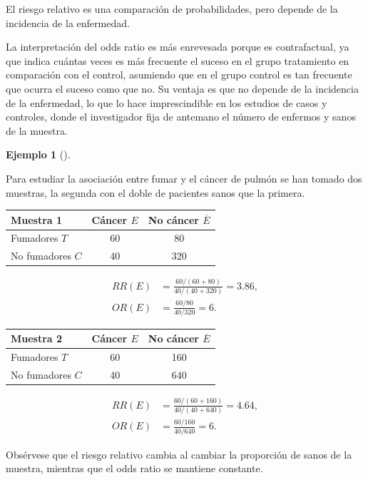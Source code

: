 \documentclass[
  spanish,
  a4paper,
]{scrreport}
\newcounter{none} %
\theoremstyle{definition}
\theoremstyle{definition}
\newtheorem{example}{Ejemplo}[chapter]
\theoremstyle{remark}
\begin{document}
El riesgo relativo es una comparación de probabilidades, pero depende de
la incidencia de la enfermedad.

La interpretación del odds ratio es más enrevesada porque es
contrafactual, ya que indica cuántas veces es más frecuente el suceso en
el grupo tratamiento en comparación con el control, asumiendo que en el
grupo control es tan frecuente que ocurra el suceso como que no. Su
ventaja es que no depende de la incidencia de la enfermedad, lo que lo
hace imprescindible en los estudios de casos y controles, donde el
investigador fija de antemano el número de enfermos y sanos de la
muestra.

\begin{example}[]\protect\hypertarget{exm-riesgo-relativo-odds-ratio}{}\label{exm-riesgo-relativo-odds-ratio}

Para estudiar la asociación entre fumar y el cáncer de pulmón se han
tomado dos muestras, la segunda con el doble de pacientes sanos que la
primera.

{\def\LTcaptype{none} %
\begin{longtable}[]{@{}lcc@{}}
\toprule\noalign{}
\textbf{Muestra 1} & Cáncer \(E\) & No cáncer \(\overline{E}\) \\
\midrule\noalign{}
\endhead
\bottomrule\noalign{}
\endlastfoot
Fumadores \(T\) & 60 & 80 \\
No fumadores \(C\) & 40 & 320 \\
\end{longtable}
}

\[
\begin{aligned}
RR(E) &= \frac{60/(60+80)}{40/(40+320)} = 3.86,\\
OR(E) &= \frac{60/80}{40/320} = 6.
\end{aligned}
\]

{\def\LTcaptype{none} %
\begin{longtable}[]{@{}lcc@{}}
\toprule\noalign{}
\textbf{Muestra 2} & Cáncer \(E\) & No cáncer \(\overline{E}\) \\
\midrule\noalign{}
\endhead
\bottomrule\noalign{}
\endlastfoot
Fumadores \(T\) & 60 & 160 \\
No fumadores \(C\) & 40 & 640 \\
\end{longtable}
}

\[
\begin{aligned}
RR(E) &= \frac{60/(60+160)}{40/(40+640)} = 4.64,\\
OR(E) &= \frac{60/160}{40/640} = 6.
\end{aligned}
\]

Obsérvese que el riesgo relativo cambia al cambiar la proporción de
sanos de la muestra, mientras que el odds ratio se mantiene constante.

\end{example}
\end{document}
